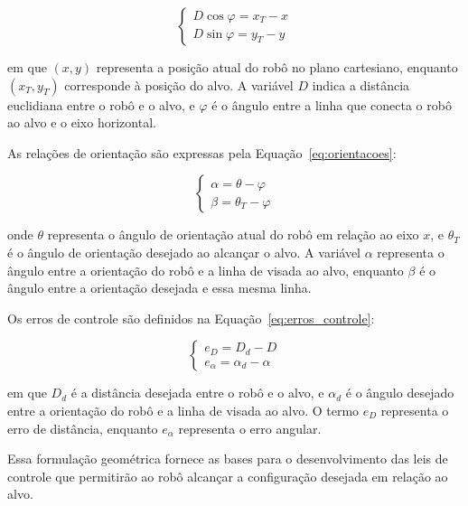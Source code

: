 \documentclass[conference]{IEEEtran}
\begin{document}
\begin{equation}
    \begin{cases}
        D \cos\varphi = x_T - x\\
        D \sin\varphi = y_T - y
    \end{cases}
    \label{eq:posicoes}
\end{equation}

em que $(x, y)$ representa a posição atual do robô no plano cartesiano, enquanto $(x_T, y_T)$ corresponde à posição do alvo. A variável $D$ indica a distância euclidiana entre o robô e o alvo, e $\varphi$ é o ângulo entre a linha que conecta o robô ao alvo e o eixo horizontal.

As relações de orientação são expressas pela Equação~\ref{eq:orientacoes}:

\begin{equation}
    \begin{cases}
        \alpha = \theta - \varphi\\
        \beta = \theta_T - \varphi
    \end{cases}
    \label{eq:orientacoes}
\end{equation}

onde $\theta$ representa o ângulo de orientação atual do robô em relação ao eixo $x$, e $\theta_T$ é o ângulo de orientação desejado ao alcançar o alvo. A variável $\alpha$ representa o ângulo entre a orientação do robô e a linha de visada ao alvo, enquanto $\beta$ é o ângulo entre a orientação desejada e essa mesma linha.

Os erros de controle são definidos na Equação~\ref{eq:erros_controle}:

\begin{equation}
    \begin{cases}
        e_D = D_d - D\\
        e_\alpha = \alpha_d - \alpha
    \end{cases}
    \label{eq:erros_controle}
\end{equation}

em que $D_d$ é a distância desejada entre o robô e o alvo, e $\alpha_d$ é o ângulo desejado entre a orientação do robô e a linha de visada ao alvo. O termo $e_D$ representa o erro de distância, enquanto $e_\alpha$ representa o erro angular.

Essa formulação geométrica fornece as bases para o desenvolvimento das leis de controle que permitirão ao robô alcançar a configuração desejada em relação ao alvo.
\end{document}
